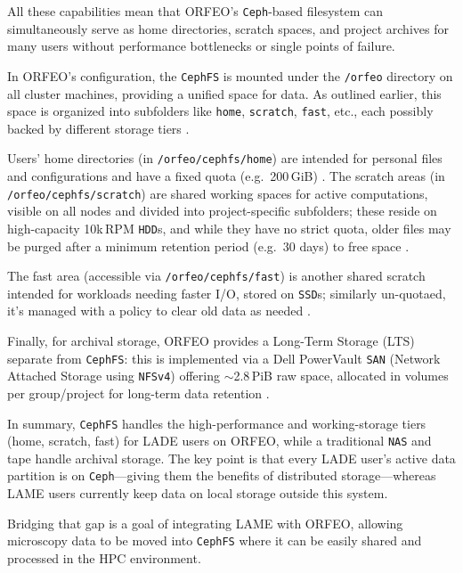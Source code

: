 All these capabilities mean that ORFEO’s \texttt{Ceph}-based filesystem can 
simultaneously serve as home directories, scratch spaces, and project archives 
for many users without performance bottlenecks or single points of failure.

\medskip

In ORFEO’s configuration, the \texttt{CephFS} is mounted under the 
\texttt{/orfeo} directory on all cluster machines, providing a unified space for 
data. As outlined earlier, this space is organized into subfolders like 
\texttt{home}, \texttt{scratch}, \texttt{fast}, etc., each possibly backed by 
different storage tiers \parencite{ORFEO_Docs_Storage}. 

Users’ home directories (in \texttt{/orfeo/cephfs/home}) are intended for 
personal files and configurations and have a fixed quota (e.g.\ 
200\,GiB) \parencite{ORFEO_Docs_Storage}. The scratch areas (in 
\texttt{/orfeo/cephfs/scratch}) are shared working spaces for active 
computations, visible on all nodes and divided into project-specific subfolders; 
these reside on high-capacity 10k\,RPM \texttt{HDD}s, and while they have no 
strict quota, older files may be purged after a minimum retention period (e.g.\ 
30 days) to free space \parencite{ORFEO_Docs_Storage}. 

The fast area (accessible via \texttt{/orfeo/cephfs/fast}) is another shared 
scratch intended for workloads needing faster I/O, stored on \texttt{SSD}s; 
similarly un-quotaed, it’s managed with a policy to clear old data as 
needed \parencite{ORFEO_Docs_Storage}. 

Finally, for archival storage, ORFEO provides a Long-Term Storage (LTS) 
separate from \texttt{CephFS}: this is implemented via a Dell PowerVault 
\texttt{SAN} (Network Attached Storage using \texttt{NFSv4}) offering 
$\sim$2.8\,PiB raw space, allocated in volumes per group/project for long-term 
data retention \parencite{ORFEO_Docs_Storage}.

\medskip

In summary, \texttt{CephFS} handles the high-performance and working-storage 
tiers (home, scratch, fast) for LADE users on ORFEO, while a traditional 
\texttt{NAS} and tape handle archival storage. The key point is that every LADE 
user’s active data partition is on \texttt{Ceph}—giving them the benefits of 
distributed storage—whereas LAME users currently keep data on local storage 
outside this system. 

Bridging that gap is a goal of integrating LAME with ORFEO, allowing microscopy 
data to be moved into \texttt{CephFS} where it can be easily shared and 
processed in the HPC environment.


